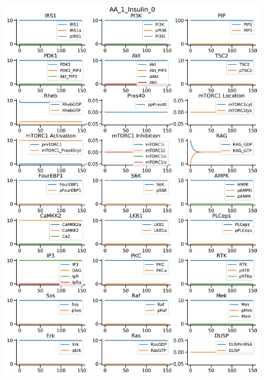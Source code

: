 \documentclass{beamer}
\begin{document}
\begin{frame}
\begin{figure}
\begin{minipage}{0.45\textwidth}
    \end{minipage}
    \begin{minipage}{0.45\textwidth}
        \centering
        \includegraphics[width=\textwidth]{../simulations/ExtendedPI3KModel/validations/AAWithInsulin/AA_1_Insulin_0-2.png}
    \end{minipage}
\end{figure}
\end{frame}


\end{document}
